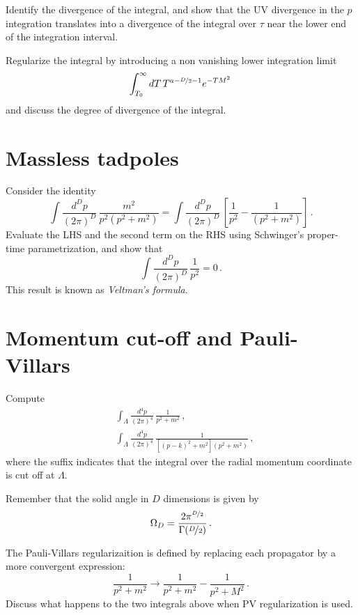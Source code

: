 \documentclass{tutorial}
\begin{document}
  Identify the divergence of the integral, and show that the UV
  divergence in the $p$ integration translates into a divergence of
  the integral over $\tau$ near the lower end of the integration
  interval.

  Regularize the integral by introducing a non vanishing lower
  integration limit
  \[
    \int_{T_0}^\infty dT\, T^{a-\nicefrac{D}{2}-1} e^{-T M^2}\,
  \]
  and discuss the degree of divergence of the integral. 

\section{ Massless tadpoles}

  Consider the identity
  \[
    \int \frac{d^Dp}{(2\pi)^D}\, \frac{m^2}{p^2(p^2+m^2)} =
    \int \frac{d^Dp}{(2\pi)^D}\, \left[
      \frac{1}{p^2} - \frac{1}{(p^2+m^2)}
    \right]\, .
  \]
  Evaluate the LHS and the second term on the RHS using Schwinger's
  proper-time parametrization, and show that
  \[
    \int \frac{d^Dp}{(2\pi)^D}\, \frac{1}{p^2} = 0\, .
  \]
  This result is known as \emph{Veltman's formula}.

  \bigskip

  \section{ Momentum cut-off and Pauli-Villars}

    Compute
    \begin{align*}
      &\int_\Lambda \frac{d^4p}{(2\pi)^4}\, \frac{1}{p^2+m^2}\, , \\
      &\int_\Lambda \frac{d^4p}{(2\pi)^4}\,
        \frac{1}{\left[(p-k)^2+m^2\right] \left(p^2+m^2\right)}\, ,
    \end{align*}
    where the suffix indicates that the integral over the radial
    momentum coordinate is cut off at $\Lambda$.

    Remember that the solid angle in $D$ dimensions is given by
    \[
      \Omega_D = \frac{2\pi^{\nicefrac{D}{2}}}{\Gamma(\nicefrac{D}{2})}\, .
    \]
   
    The Pauli-Villars regularizaition is defined by replacing each
    propagator by a more convergent expression:
    \[
      \frac{1}{p^2+m^2} \longrightarrow
      \frac{1}{p^2+m^2} - \frac{1}{p^2+M^2} \, .
    \]
    Discuss what happens to the two integrals above when PV
    regularization is used. 
    
\end{document}

